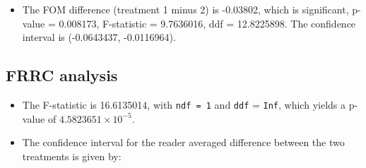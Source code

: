\documentclass[
]{book}
\newenvironment{Shaded}{\begin{snugshade}}{\end{snugshade}}
\newcommand{\CommentTok}[1]{\textcolor[rgb]{0.56,0.35,0.01}{\textit{#1}}}
\newcommand{\NormalTok}[1]{#1}
\newcommand{\OperatorTok}[1]{\textcolor[rgb]{0.81,0.36,0.00}{\textbf{#1}}}
\providecommand{\tightlist}{%
  \setlength{\itemsep}{0pt}\setlength{\parskip}{0pt}}
\begin{document}
\begin{itemize}
\tightlist
\item
  The FOM difference (treatment 1 minus 2) is -0.03802, which is significant, p-value = 0.008173, F-statistic = 9.7636016, ddf = 12.8225898. The confidence interval is (-0.0643437, -0.0116964).
\end{itemize}

\hypertarget{frrc-analysis}{%
\subsection{FRRC analysis}\label{frrc-analysis}}

\begin{Shaded}
\end{Shaded}

\begin{itemize}
\item
  The F-statistic is 16.6135014, with \texttt{ndf\ =\ 1} and \texttt{ddf} = \texttt{Inf}, which yields a p-value of \ensuremath{4.5823651\times 10^{-5}}.
\item
  The confidence interval for the reader averaged difference between the two treatments is given by:
\end{itemize}

\begin{Shaded}
\end{Shaded}
\end{document}
